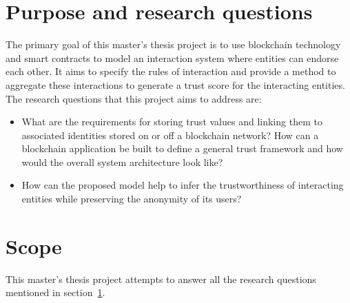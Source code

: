 \section{Purpose and research questions} \label{ResearchQuestions}
The primary goal of this master's thesis project is to use blockchain
technology and smart contracts to model an interaction system where entities
can endorse each other. It aims to specify the rules of interaction and provide
a method to aggregate these interactions to generate a trust score for the
interacting entities. The research questions that this project aims to address
are: 
\begin{itemize}
		\item What are the requirements for storing trust values and linking
			them to associated identities stored on or off a blockchain
			network? How can a blockchain application be built to define a
			general trust framework and how would the overall system
			architecture look like?\label{question2} 
		\item How can the proposed model help to infer the trustworthiness of
			interacting entities while preserving the anonymity of its users? 
\end{itemize}
\section{Scope} 
This master's thesis project attempts to answer all the research questions
mentioned in section~\ref{ResearchQuestions}.  

